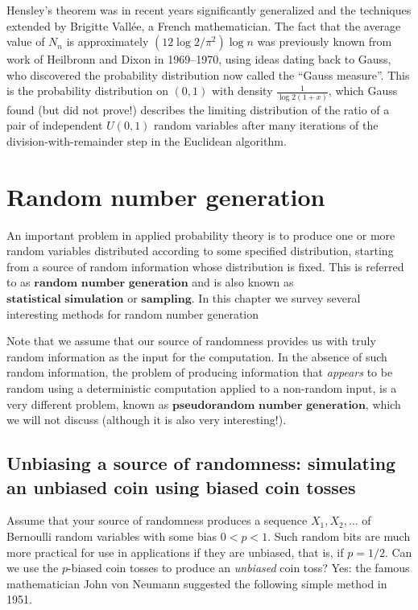 \documentclass[11pt]{report}
\theoremstyle{plain}
\theoremstyle{definition}
\begin{document}
\noindent Hensley's theorem was in recent years significantly
generalized and the techniques extended by Brigitte
Vallée, a French mathematician. The fact that the
average value of $N_n$ is approximately
$(12\log 2/\pi^2)\log n$ was previously known from
work of Heilbronn and Dixon in 1969--1970, using ideas
dating back to Gauss, who discovered the probability
distribution now called the ``Gauss measure''. This is
the probability distribution on $(0,1)$ with density
$\frac{1}{\log 2(1+x)}$, which Gauss found (but did
not prove!) describes the limiting distribution of the
ratio of a pair of independent $U(0,1)$ random
variables after many iterations of the
division-with-remainder step in the Euclidean
algorithm.

\chapter{Random number generation}

An important problem in applied probability theory is
to produce one or more random variables distributed
according to some specified distribution, starting
from a source of random information whose distribution
is fixed. This is referred to as
$\textbf{random number generation}$ and is also known
as $\textbf{statistical simulation}$ or
$\textbf{sampling}$. In this chapter we survey
several interesting methods for random number
generation

Note that we assume that our source of randomness
provides us with truly random information as the input
for the computation. In the absence of such random
information, the problem of producing information that
\emph{appears} to be random using a deterministic
computation applied to a non-random input, is a very
different problem, known as
$\textbf{pseudorandom number generation}$, which we
will not discuss (although it is also very
interesting!).

\section{Unbiasing a source of randomness: simulating an unbiased coin using biased coin tosses}

Assume that your source of randomness produces a
sequence $X_1, X_2, \ldots$ of Bernoulli random
variables with some bias $0<p<1$. Such random bits
are much more practical for use in applications if
they are unbiased, that is, if $p=1/2$. Can we use
the $p$-biased coin tosses to produce an \emph{unbiased}
coin toss? Yes: the famous mathematician John von
Neumann suggested the following simple method in 1951.
\end{document}
